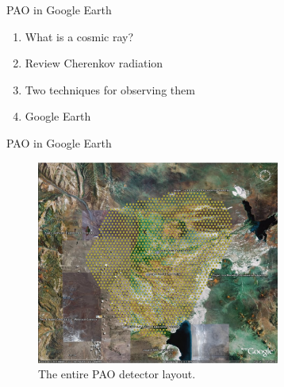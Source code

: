 \documentclass{beamer}
\begin{document}
\begin{frame}{PAO in Google Earth}
\begin{enumerate}
\item What is a cosmic ray?
\item Review Cherenkov radiation
\item Two techniques for observing them
\item Google Earth
\end{enumerate}
\end{frame}

\begin{frame}{PAO in Google Earth}
\begin{figure}
\centering
\includegraphics[width=8cm]{figures/Auger.jpg}
\caption{\label{fig:aug} The entire PAO detector layout.}
\end{figure}
\end{frame}
\end{document}
